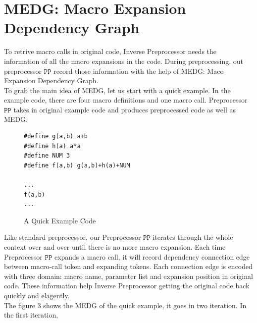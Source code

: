 \documentclass[11pt]{article}
\theoremstyle{theorem}
\theoremstyle{lemma}
\theoremstyle{property}
\theoremstyle{definition}
\theoremstyle{assumption}
\begin{document}
\section{MEDG: Macro Expansion Dependency Graph}

To retrive macro calls in original code, Inverse Preprocessor needs the information of all the macro expansions in the code. 
During preprocessing, out preprocessor $\mathtt{PP}$ record those information with the help of MEDG: Maco Expansion Dependency Graph. \\

To grab the main idea of MEDG, let us start with a quick example. 
In the example code, there are four macro definitions and one macro call.
Preprocessor $\mathtt{PP}$ takes in original example code and produces preprocessed code as well as MEDG.

\begin{figure}[H]
\begin{lstlisting}[language={[ANSI]C}, basicstyle=\ttfamily\small, keywordstyle=\color{blue!70}, commentstyle=\color{red!50!green!50!blue!50}, frame=shadowbox, rulesepcolor=\color{red!20!green!20!blue!20}]
#define g(a,b) a+b
#define h(a) a*a
#define NUM 3
#define f(a,b) g(a,b)+h(a)+NUM

...
f(a,b)
...
\end{lstlisting}
\caption{A Quick Example Code}
\end{figure}

Like standard preprocessor, our Preprocessor $\mathtt{PP}$ iterates through the whole context over and over until there is no more macro expansion. 
Each time Preprocessor $\mathtt{PP}$ expands a macro call, it will record dependency connection edge between macro-call token and expanding tokens.
Each connection edge is encoded with three domain: macro name, parameter list and expansion position in original code.
These information help Inverse Preprocessor getting the original code back quickly and elagently. \\

The figure 3 shows the MEDG of the quick example, it goes in two iteration. In the first iteration, \\

\end{document}

